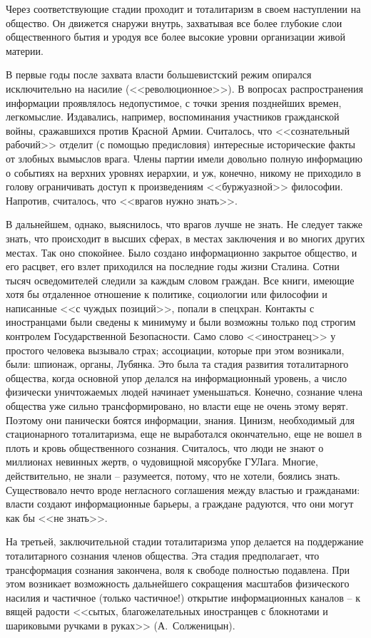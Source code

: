 \documentclass{book}
\begin{document}
Через соответствующие стадии проходит и тоталитаризм в своем наступлении на общество. Он движется снаружи внутрь, захватывая все 
более глубокие слои общественного бытия и уродуя все более высокие уровни организации живой материи.

В первые годы после захвата власти большевистский ре­жим опирался исключительно на насилие (<<революционное>>). В вопросах распространения информации проявлялось недо­пустимое, с точки зрения позднейших времен, легкомыслие. Издавались, например, воспоминания участников гражданской войны, сражавшихся против Красной Армии. Считалось, что <<сознательный рабочий>> отделит (с помощью предисловия) интересные исторические факты от злобных вымыслов врага. Члены партии имели довольно полную информацию о событиях на верхних уровнях иерархии, и уж, конечно, никому не приходило в голову ограничивать доступ к произведениям <<буржуазной>> философии. Напротив, считалось, что <<врагов нужно знать>>.

В дальнейшем, однако, выяснилось, что врагов лучше не знать. Не следует также знать, что происходит в высших сферах, в местах заключения и во многих других местах. Так оно спокойнее. Было создано информационно закрытое общество, и его расцвет, его взлет приходился на последние годы жизни Сталина. Сотни тысяч осведомителей следили за каждым словом граждан. Все книги, имеющие хотя бы отдаленное отношение к политике, социологии или философии и написанные <<с чуждых позиций>>, попали в спецхран. Контакты с иностранцами были сведены к минимуму и были возможны только под строгим контролем Государственной Безопасности. Само слово <<иностранец>> у простого человека вызывало страх; ассоциации, которые при этом возникали, были: шпионаж, органы, Лубянка.
Это была та стадия развития тоталитарного общества, когда основной упор делался на информационный уровень, а число физически уничтожаемых людей начинает уменьшаться. Конечно, сознание члена общества уже сильно трансформировано, но власти еще не очень этому верят. Поэтому они панически боятся информации, знания.  Цинизм, необходимый для стационарного тоталитаризма, еще не выработался окончательно, еще не вошел в плоть и кровь общественного сознания. Считалось, что люди не знают о  миллионах невинных жертв, о чудовищной мясорубке ГУЛага. Многие, действительно, не знали -- разумеется, потому, что не хотели, боялись знать. Существовало нечто вроде негласного соглашения между властью и гражданами: власти создают информационные барьеры, а граждане радуются, что они могут как бы <<не знать>>.

На третьей, заключительной стадии тоталитаризма упор делается на поддержание тоталитарного сознания  членов об­щества. Эта стадия предполагает, что трансформация сознания закончена, воля к свободе полностью подавлена. При этом возникает возможность дальнейшего сокращения масштабов физического насилия и частичное (только частичное!) открытие информационных каналов -- к вящей радости <<сытых, благожелательных иностранцев с блокнотами и шариковыми ручками в руках>> (А.~Солженицын).
\end{document}
